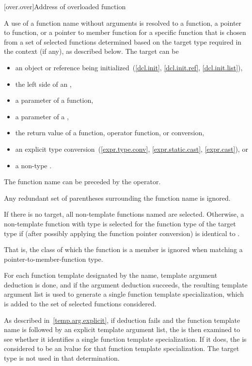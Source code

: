 %

[over.over]{Address of overloaded function}%
%

\pnum
A use of a function name without arguments is resolved to
a function, a pointer to function, or a pointer to member function
for a specific function
that is chosen from a set of selected functions
determined based on the target type required in the context (if any),
as described below.
The target can be
\begin{itemize}
\item
an object or reference being initialized~(\ref{dcl.init}, \ref{dcl.init.ref},
\ref{dcl.init.list}),
\item
the left side of an ,
\item
a parameter of a function,
\item
a parameter of a ,
\item
the return value of a function, operator function, or conversion,
\item
an explicit type conversion~(\ref{expr.type.conv}, \ref{expr.static.cast},
\ref{expr.cast}), or
\item
a non-type
.
\end{itemize}
The function name can be preceded by the \tcode{\&} operator.
\begin{note}
Any redundant set of parentheses surrounding the function name is
ignored.
\end{note}

\pnum
If there is no target, all non-template functions named are selected.
Otherwise, a non-template function with type 
is selected for the function type  of the target type
if 
(after possibly applying the function pointer conversion)
is identical to .
\begin{note}
That is, the class of which the function is a member is ignored when matching a
pointer-to-member-function type.
\end{note}

\pnum
For each function template designated by the name,
template argument deduction is done, and
if the argument deduction succeeds,
the
resulting template argument list is
used to generate a single
function template specialization,
which is added to the set of selected functions
considered.
\begin{note}
As described in~\ref{temp.arg.explicit}, if deduction fails and the
function template name is followed by an explicit template argument list,
the
is then examined to see whether it identifies a single function template
specialization. If it does, the
is considered to be an lvalue for that function template specialization.
The target type is not used in that determination.
\end{note}

